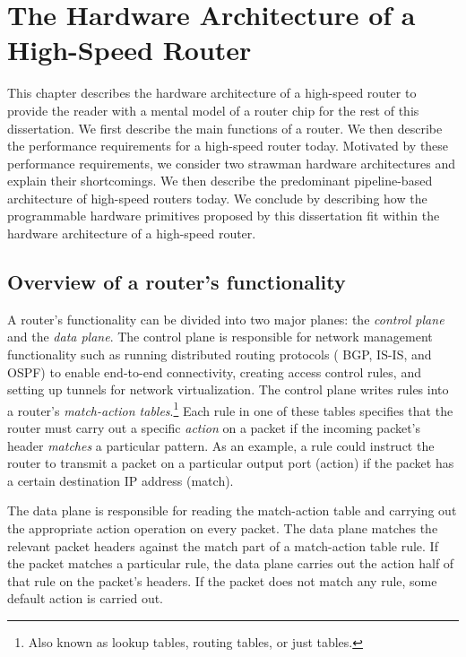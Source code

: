 \chapter{The Hardware Architecture of a High-Speed Router}
\label{chap:arch}
This chapter describes the hardware architecture of a high-speed router to
provide the reader with a mental model of a router chip for the rest of this
dissertation. We first describe the main functions of a router. We then
describe the performance requirements for a high-speed router today. Motivated
by these performance requirements, we consider two strawman hardware
architectures and explain their shortcomings. We then describe the predominant
pipeline-based architecture of high-speed routers today. We conclude by
describing how the programmable hardware primitives proposed by this
dissertation fit within the hardware architecture of a high-speed router.

\section{Overview of a router's functionality}

A router's functionality can be divided into two major planes: the {\em control
plane} and the {\em data plane}. The control plane is responsible for network
management functionality such as running distributed routing protocols (\eg
BGP, IS-IS, and OSPF) to enable end-to-end connectivity, creating access
control rules, and setting up tunnels for network virtualization. The control
plane writes rules into a router's {\em match-action tables}.\footnote{Also
known as lookup tables, routing tables, or just tables.} Each rule in one of
these tables specifies that the router must carry out a specific {\em action}
on a packet if the incoming packet's header {\em matches} a particular pattern.
As an example, a rule could instruct the router to transmit a packet on a
particular output port (action) if the packet has a certain destination IP address
(match).

The data plane is responsible for reading the match-action table and carrying
out the appropriate action operation on every packet.  The data plane matches
the relevant packet headers against the match part of a match-action table
rule. If the packet matches a particular rule, the data plane carries out the
action half of that rule on the packet's headers. If the packet does not match
any rule, some default action is carried out.

